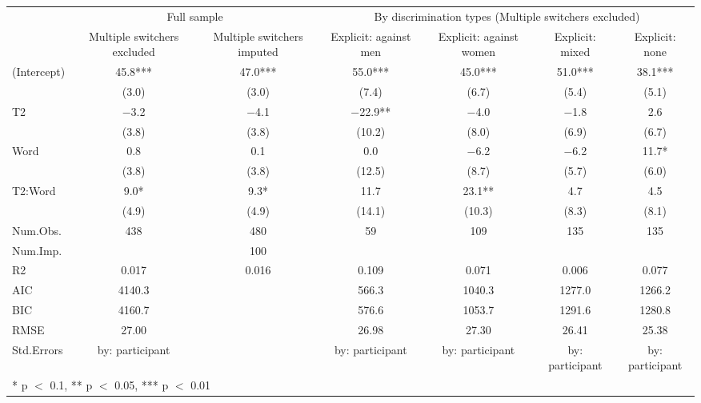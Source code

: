 \begin{table}
\centering
\begin{tabular}[t]{lcccccc}
\toprule
\multicolumn{1}{c}{ } & \multicolumn{2}{c}{Full sample} & \multicolumn{4}{c}{By discrimination types (Multiple switchers excluded)} \\
\cmidrule(l{3pt}r{3pt}){2-3} \cmidrule(l{3pt}r{3pt}){4-7}
  & Multiple switchers excluded & Multiple switchers imputed & Explicit: against men & Explicit: against women & Explicit: mixed & Explicit: none\\
\midrule
(Intercept) & \num{45.8}*** & \num{47.0}*** & \num{55.0}*** & \num{45.0}*** & \num{51.0}*** & \num{38.1}***\\
 & (\num{3.0}) & (\num{3.0}) & (\num{7.4}) & (\num{6.7}) & (\num{5.4}) & (\num{5.1})\\
T2 & \num{-3.2} & \num{-4.1} & \num{-22.9}** & \num{-4.0} & \num{-1.8} & \num{2.6}\\
 & (\num{3.8}) & (\num{3.8}) & (\num{10.2}) & (\num{8.0}) & (\num{6.9}) & (\num{6.7})\\
Word & \num{0.8} & \num{0.1} & \num{0.0} & \num{-6.2} & \num{-6.2} & \num{11.7}*\\
 & (\num{3.8}) & (\num{3.8}) & (\num{12.5}) & (\num{8.7}) & (\num{5.7}) & (\num{6.0})\\
T2:Word & \num{9.0}* & \num{9.3}* & \num{11.7} & \num{23.1}** & \num{4.7} & \num{4.5}\\
 & (\num{4.9}) & (\num{4.9}) & (\num{14.1}) & (\num{10.3}) & (\num{8.3}) & (\num{8.1})\\
\midrule
Num.Obs. & \num{438} & \num{480} & \num{59} & \num{109} & \num{135} & \num{135}\\
Num.Imp. &  & \num{100} &  &  &  & \\
R2 & \num{0.017} & \num{0.016} & \num{0.109} & \num{0.071} & \num{0.006} & \num{0.077}\\
AIC & \num{4140.3} &  & \num{566.3} & \num{1040.3} & \num{1277.0} & \num{1266.2}\\
BIC & \num{4160.7} &  & \num{576.6} & \num{1053.7} & \num{1291.6} & \num{1280.8}\\
RMSE & \num{27.00} &  & \num{26.98} & \num{27.30} & \num{26.41} & \num{25.38}\\
Std.Errors & by: participant &  & by: participant & by: participant & by: participant & by: participant\\
\bottomrule
\multicolumn{7}{l}{\rule{0pt}{1em}* p $<$ 0.1, ** p $<$ 0.05, *** p $<$ 0.01}\\
\end{tabular}
\end{table}

